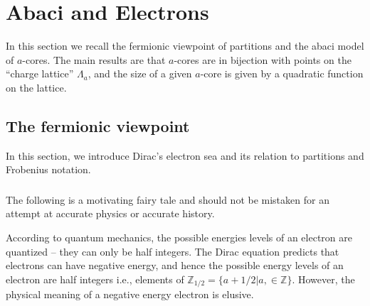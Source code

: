 \documentclass{amsart}[12pt]
\theoremstyle{definition}
\newtheorem{definition}[dummy]{Definition}
\newcommand{\Z}{\mathbb{Z}}
\newcommand{\R}{\mathbb{R}}
\begin{document}



\section{Abaci and Electrons}

In this section we recall the fermionic viewpoint of partitions and the abaci model of $a$-cores.  The main results are that $a$-cores are in bijection with points on the ``charge lattice'' $\Lambda_a$, and the size of a given $a$-core is given by a quadratic function on the lattice.



\subsection{The fermionic viewpoint}
In this section, we introduce Dirac's electron sea and its relation to partitions and Frobenius notation.

\subsubsection{} The following is a motivating fairy tale and should not be mistaken for an attempt at accurate physics or accurate history.


According to quantum mechanics, the possible energies levels of an electron are quantized -- they can only be half integers.  The Dirac equation predicts that electrons can have negative energy, and hence the possible energy levels of an electron are half integers i.e., elements of $\Z_{1/2}=\{a+1/2|a,\in\Z\}$.  However, the physical meaning of a negative energy electron is elusive.
\end{document}
